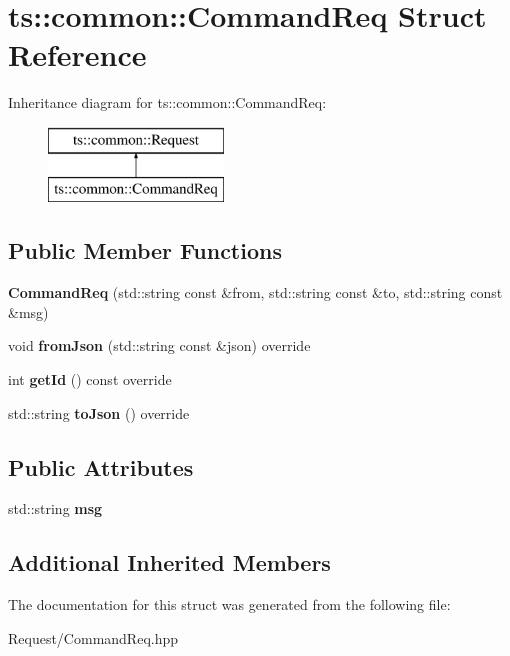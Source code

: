 \hypertarget{structts_1_1common_1_1_command_req}{}\section{ts\+:\+:common\+:\+:Command\+Req Struct Reference}
\label{structts_1_1common_1_1_command_req}
Inheritance diagram for ts\+:\+:common\+:\+:Command\+Req\+:\begin{figure}[H]
\begin{center}
\leavevmode
\includegraphics[height=2.000000cm]{structts_1_1common_1_1_command_req}
\end{center}
\end{figure}
\subsection*{Public Member Functions}
\begin{DoxyCompactItemize}
\item 
\mbox{\label{structts_1_1common_1_1_command_req_a59cae0eb1c1c91d65f87758c2c0dc6a0}} 
{\bfseries Command\+Req} (std\+::string const \&from, std\+::string const \&to, std\+::string const \&msg)
\item 
\mbox{\label{structts_1_1common_1_1_command_req_ab1ce7b22d64dc870748ef7a13fa97827}} 
void {\bfseries from\+Json} (std\+::string const \&json) override
\item 
\mbox{\label{structts_1_1common_1_1_command_req_a0057a6bb044ff1ba1cfe89e53d332103}} 
int {\bfseries get\+Id} () const override
\item 
\mbox{\label{structts_1_1common_1_1_command_req_ab712fbf3b011942adcc74c4db8767d37}} 
std\+::string {\bfseries to\+Json} () override
\end{DoxyCompactItemize}
\subsection*{Public Attributes}
\begin{DoxyCompactItemize}
\item 
\mbox{\label{structts_1_1common_1_1_command_req_a41a5a1ea958a4dfddfa9ce25f6413bf5}} 
std\+::string {\bfseries msg}
\end{DoxyCompactItemize}
\subsection*{Additional Inherited Members}


The documentation for this struct was generated from the following file\+:\begin{DoxyCompactItemize}
\item 
Request/Command\+Req.\+hpp\end{DoxyCompactItemize}
